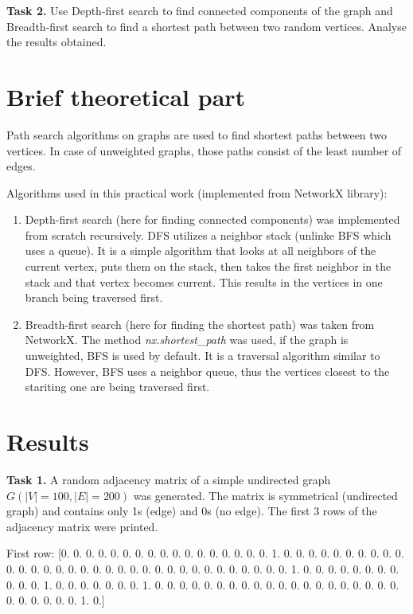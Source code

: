 \documentclass[12pt, a4paper]{article}
\begin{document}
\textbf{Task 2.} Use Depth-first search to find connected components of the graph and Breadth-first search to find a shortest path between two random vertices. Analyse the results obtained.

\section*{Brief theoretical part}

Path search algorithms on graphs are used to find shortest paths between two vertices. In case of unweighted graphs, those paths consist of the least number of edges.

Algorithms used in this practical work (implemented from NetworkX library):
\begin{enumerate}
	\item Depth-first search (here for finding connected components) was implemented from scratch recursively. DFS utilizes a neighbor stack (unlinke BFS which uses a queue). It is a simple algorithm that looks at all neighbors of the current vertex, puts them on the stack, then takes the first neighbor in the stack and that vertex becomes current. This results in the vertices in one branch being traversed first.
	\item Breadth-first search (here for finding the shortest path) was taken from NetworkX. The method \textit{nx.shortest\_path} was used, if the graph is unweighted, BFS is used by default. It is a traversal algorithm similar to DFS. However, BFS uses a neighbor queue, thus the vertices closest to the stariting one are being traversed first.
\end{enumerate}

\newpage

\section*{Results}

\textbf{Task 1.} A random adjacency matrix of a simple undirected graph $G(|V|=100, |E|=200)$ was generated. The matrix is symmetrical (undirected graph) and contains only 1s (edge) and 0s (no edge). The first 3 rows of the adjacency matrix were printed.

\noindent
First row: {\footnotesize [0. 0. 0. 0. 0. 0. 0. 0. 0. 0. 0. 0. 0. 0. 0. 0. 0. 1. 0. 0. 0. 0. 0. 0. 0. 0. 0. 0. 0. 0. 0. 0. 0. 0. 0. 0. 0. 0. 0. 0. 0. 0. 0. 0. 0. 0. 0. 0. 0. 0. 0. 1. 0. 0. 0. 0. 0. 0. 0. 0. 0. 0. 0. 1. 0. 0. 0. 0. 0. 0. 0. 1. 0. 0. 0. 0. 0. 0. 0. 0. 0. 0. 0. 0. 0. 0. 0. 0. 0. 0. 0. 0. 0. 0. 0. 0. 0. 0. 1. 0.]}
\end{document}
